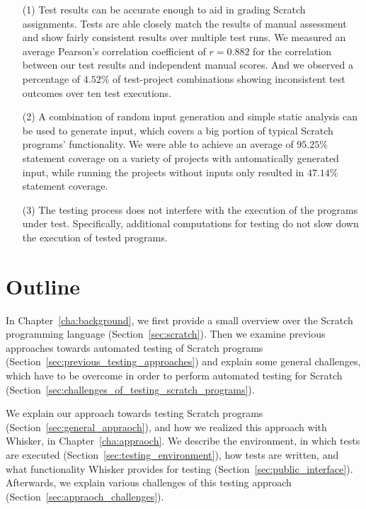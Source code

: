 \begin{enumerate}
    \item[(1)] Test results can be accurate enough to aid in grading Scratch assignments.
        Tests are able closely match the results of manual assessment and show fairly consistent results over multiple test runs.
        We measured an average Pearson's correlation coefficient of $r = 0.882$ for the correlation
        between our test results and independent manual scores.
        And we observed a percentage of $4.52\%$ of test-project combinations showing inconsistent test outcomes over ten test executions.
    \item[(2)] %
        A combination of random input generation and simple static analysis can be used to generate input, which covers a big portion of
        typical Scratch programs' functionality.
        We were able to achieve an average of $95.25\%$ statement coverage on a variety of projects with automatically generated input,
        while running the projects without inputs only resulted in $47.14\%$ statement coverage.
    \item[(3)] The testing process does not interfere with the execution of the programs under test.
        Specifically, additional computations for testing do not slow down the execution of tested programs.
\end{enumerate}

\section{Outline}

In Chapter~\ref{cha:background}, we first provide a small overview over the Scratch programming language (Section~\ref{sec:scratch}).
Then we examine previous approaches towards automated testing of Scratch programs (Section~\ref{sec:previous_testing_approaches})
and explain some general challenges, which have to be overcome in order to perform automated testing for Scratch (Section~\ref{sec:challenges_of_testing_scratch_programs}).%
\parspace

We explain our approach towards testing Scratch programs (Section~\ref{sec:general_appraoch}),
and how we realized this approach with Whisker, in Chapter~\ref{cha:appraoch}.
We describe the environment, in which tests are executed (Section~\ref{sec:testing_environment}),
how tests are written, and what functionality Whisker provides for testing (Section~\ref{sec:public_interface}).
Afterwards, we explain various challenges of this testing approach (Section~\ref{sec:appraoch_challenges}).
\parspace

